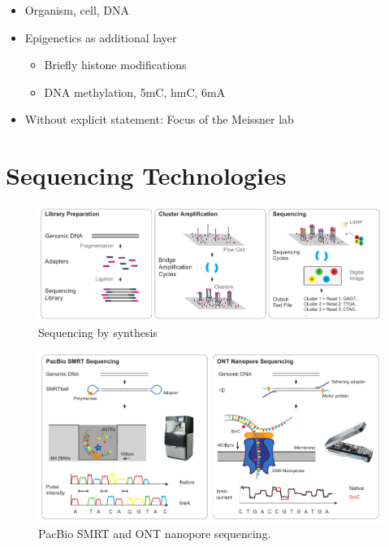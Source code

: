 \begin{itemize}
    \item Organism, cell, DNA
    \item Epigenetics as additional layer
    \begin{itemize}
        \item Briefly histone modifications
        \item DNA methylation, 5mC, hmC, 6mA
    \end{itemize}
    \item Without explicit statement: Focus of the Meissner lab
\end{itemize}




\section{Sequencing Technologies}
\label{sec:intro:sequencing}

\begin{figure}[h]
	\centering
	\includegraphics[width=1.0\textwidth]{figures/intro/sbs.pdf}
	\captionsetup{format=plain}
	\caption[Sequencing by synthesis]{Sequencing by synthesis}
	\label{fig:intro:sbs}
\end{figure}

\begin{figure}[h]
	\centering
	\includegraphics[width=1.0\textwidth]{figures/intro/long_read.pdf}
	\captionsetup{format=plain}
	\caption[Long read sequencing]{PacBio SMRT and ONT nanopore sequencing.}
	\label{fig:intro:longread}
\end{figure}

